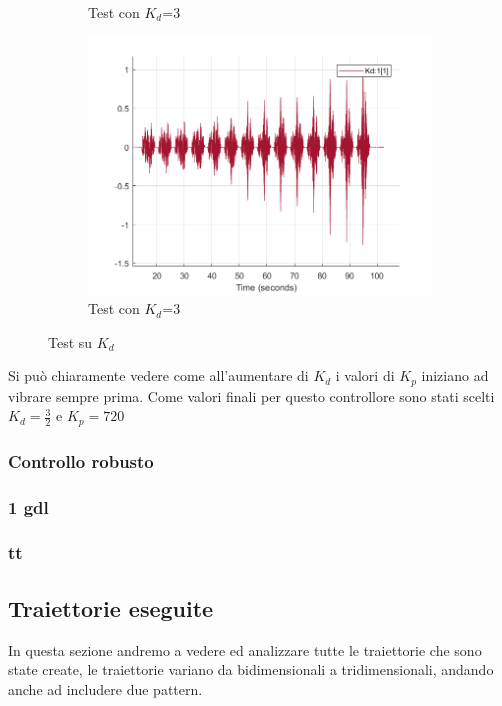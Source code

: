 \begin{figure}[!ht]
\begin{subfigure}{.5\textwidth}
  \caption{Test con $K_d$=3}
  \label{fig:sub-kd3}
\end{subfigure}
\begin{subfigure}{.5\textwidth}
  \centering
  \includegraphics[width=.8\linewidth]{Immagini/Sperimentale/Test_Kd=3.png}  
  \caption{Test con $K_d$=3}
  \label{fig:sub-kd1}
\end{subfigure}
\caption{Test su $K_d$}
\label{fig:KdTest}
\end{figure}
Si può chiaramente vedere come all'aumentare di $K_d$ i valori di $K_p$ iniziano ad vibrare sempre prima. Come valori finali per questo controllore sono stati scelti $K_d = \frac{3}{2}$ e $K_p = 720$
\subsubsection{Controllo robusto}
\subsubsection*{1 gdl}
\subsubsection*{tt}
\subsection{Traiettorie eseguite}
In questa sezione andremo a vedere ed analizzare tutte le traiettorie che sono state create, le traiettorie variano da bidimensionali a tridimensionali, andando anche ad includere due pattern.